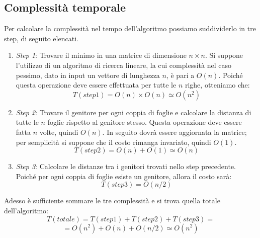 \subsection{Complessità temporale}
Per calcolare la complessità nel tempo dell'algoritmo possiamo suddividerlo in tre step, di seguito elencati.
\begin{enumerate}
	\item \textit{Step 1}: Trovare il minimo in una matrice di dimensione $n \times n$.
	\newline
	Si suppone l'utilizzo di un algoritmo di ricerca lineare, la cui complessità nel caso pessimo, dato in input un vettore di lunghezza $n$, è pari a $O(n)$. Poiché questa operazione deve essere effettuata per tutte le $n$ righe, otteniamo che:
	\[T(step 1)=O(n) \times O(n) \simeq O(n^2)\]
	\item \textit{Step 2}: Trovare il genitore per ogni coppia di foglie e calcolare la distanza di tutte le $n$ foglie  rispetto al genitore stesso.
	\newline
	Questa operazione deve essere fatta $n$ volte, quindi $O(n)$. In seguito dovrà essere aggiornata la matrice; per semplicità si suppone che il costo rimanga invariato, quindi $O(1)$.
	\[T(step 2)=O(n)+O(1) \simeq O(n)\]
	\item \textit{Step 3}: Calcolare le distanze tra i genitori trovati nello step precedente.
	\newline
	Poiché per ogni coppia di foglie esiste un genitore, allora il costo sarà:
	\[T(step 3)=O(n/2)\]
\end{enumerate}
Adesso è sufficiente sommare le tre complessità e si trova quella totale dell'algoritmo:
\[T(totale)=T(step 1)+T(step 2)+T(step 3)=\]
\[=O(n^2)+O(n)+O(n/2) \simeq O(n^2) \]

\newpage

